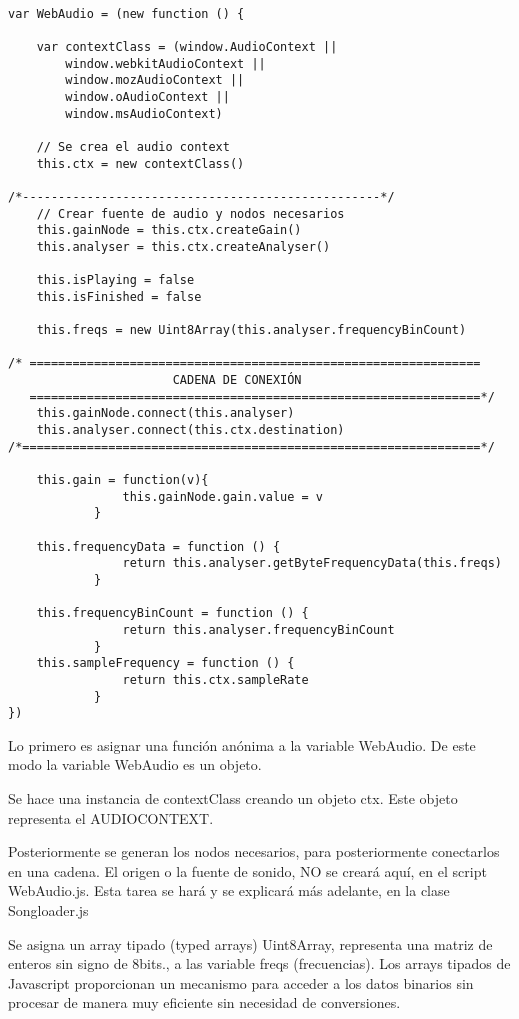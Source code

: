 \begin{verbatim}
 
var WebAudio = (new function () {
    
    var contextClass = (window.AudioContext ||
        window.webkitAudioContext ||
        window.mozAudioContext ||
        window.oAudioContext ||
        window.msAudioContext)
    
    // Se crea el audio context
    this.ctx = new contextClass()
    
/*--------------------------------------------------*/
    // Crear fuente de audio y nodos necesarios
    this.gainNode = this.ctx.createGain()
    this.analyser = this.ctx.createAnalyser()
      
    this.isPlaying = false
    this.isFinished = false
    
    this.freqs = new Uint8Array(this.analyser.frequencyBinCount)
    
/* ===============================================================
                       CADENA DE CONEXIÓN
   ===============================================================*/
    this.gainNode.connect(this.analyser)
    this.analyser.connect(this.ctx.destination)
/*================================================================*/    

    this.gain = function(v){
			    this.gainNode.gain.value = v
            }	
	
    this.frequencyData = function () {
                return this.analyser.getByteFrequencyData(this.freqs)
            }
       
    this.frequencyBinCount = function () {
                return this.analyser.frequencyBinCount
            }
	this.sampleFrequency = function () {
                return this.ctx.sampleRate
            }
})
\end{verbatim}

Lo primero es asignar una función anónima a la variable WebAudio. De este modo la variable WebAudio es un objeto. 

Se hace una instancia de contextClass creando un objeto ctx. Este objeto representa el AUDIOCONTEXT.

Posteriormente se generan los nodos necesarios, para posteriormente conectarlos en una cadena. El origen o la fuente de sonido, NO se creará aquí, en el script WebAudio.js. Esta tarea se hará y se explicará más adelante, en la clase Songloader.js

Se asigna un  array tipado (typed arrays) Uint8Array, representa una matriz de enteros sin signo de 8bits., a las variable freqs (frecuencias). Los arrays tipados de Javascript proporcionan un mecanismo para acceder a los datos binarios sin procesar de manera muy eficiente sin necesidad de conversiones.

